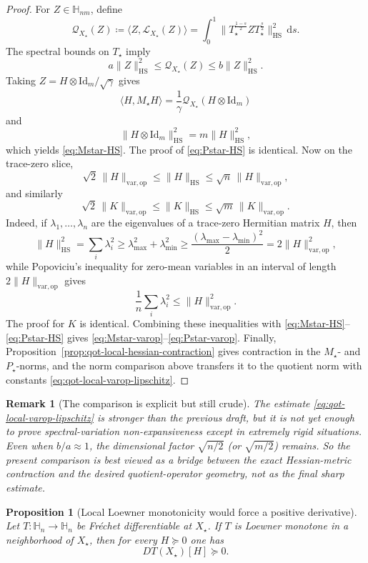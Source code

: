\documentclass[11pt]{article}
\newcommand{\Id}{\mathrm{Id}}
\newcommand{\eqdef}{\coloneqq}
\newcommand{\dotp}[2]{\langle #1,#2\rangle}
\newcommand{\Hh}{\mathbb{H}}
\newcommand{\op}{\mathrm{op}}
\newcommand{\varop}{\mathrm{var},\op}
\theoremstyle{plain}
\newtheorem{proposition}{Proposition}[section]
\newtheorem{remark}{Remark}[section]
\begin{document}
\begin{proof}
For $Z \in \Hh_{nm}$, define
\[
\mathcal Q_{X_\star}(Z)
\eqdef
\dotp{Z}{\mathcal L_{X_\star}(Z)}
=
\int_0^1 \|T_\star^{\frac{1-s}{2}} Z T_\star^{\frac{s}{2}}\|_{\mathrm{HS}}^2\,\mathrm ds.
\]
The spectral bounds on $T_\star$ imply
\[
a \|Z\|_{\mathrm{HS}}^2
\le
\mathcal Q_{X_\star}(Z)
\le
b \|Z\|_{\mathrm{HS}}^2.
\]
Taking $Z=H \otimes \Id_m/\sqrt{\gamma}$ gives
\[
\dotp{H}{M_\star H}
=
\frac1\gamma \mathcal Q_{X_\star}(H \otimes \Id_m)
\]
and
\[
\|H \otimes \Id_m\|_{\mathrm{HS}}^2
=
m\|H\|_{\mathrm{HS}}^2,
\]
which yields \eqref{eq:Mstar-HS}. The proof of \eqref{eq:Pstar-HS} is identical.
Now on the trace-zero slice,
\[
\sqrt{2}\,\|H\|_{\varop}\le \|H\|_{\mathrm{HS}}\le \sqrt{n}\,\|H\|_{\varop},
\]
and similarly
\[
\sqrt{2}\,\|K\|_{\varop}\le \|K\|_{\mathrm{HS}}\le \sqrt{m}\,\|K\|_{\varop}.
\]
Indeed, if $\lambda_1,\dots,\lambda_n$ are the eigenvalues of a trace-zero Hermitian matrix $H$, then
\[
\|H\|_{\mathrm{HS}}^2=\sum_i \lambda_i^2
\ge \lambda_{\max}^2+\lambda_{\min}^2
\ge \frac{(\lambda_{\max}-\lambda_{\min})^2}{2}
= 2\|H\|_{\varop}^2,
\]
while Popoviciu's inequality for zero-mean variables in an interval of length $2\|H\|_{\varop}$ gives
\[
\frac{1}{n}\sum_i \lambda_i^2 \le \|H\|_{\varop}^2.
\]
The proof for $K$ is identical.
Combining these inequalities with \eqref{eq:Mstar-HS}--\eqref{eq:Pstar-HS} gives \eqref{eq:Mstar-varop}--\eqref{eq:Pstar-varop}.
Finally, Proposition~\ref{prop:qot-local-hessian-contraction} gives contraction in the $M_\star$- and $P_\star$-norms, and the norm comparison above transfers it to the quotient norm with constants \eqref{eq:qot-local-varop-lipschitz}.
\end{proof}

\begin{remark}[The comparison is explicit but still crude]
\label{rem:qot-varop-comparison-crude}
The estimate \eqref{eq:qot-local-varop-lipschitz} is stronger than the previous draft, but it is not yet enough to prove spectral-variation non-expansiveness except in extremely rigid situations.
Even when $b/a \approx 1$, the dimensional factor $\sqrt{n/2}$ (or $\sqrt{m/2}$) remains.
So the present comparison is best viewed as a bridge between the exact Hessian-metric contraction and the desired quotient-operator geometry, not as the final sharp estimate.
\end{remark}

\begin{proposition}[Local Loewner monotonicity would force a positive derivative]
\label{prop:qot-local-monotone-derivative}
Let $T:\Hh_n \to \Hh_n$ be Fr\'echet differentiable at $X_\star$.
If $T$ is Loewner monotone in a neighborhood of $X_\star$, then for every $H \succeq 0$ one has
\[
DT(X_\star)[H] \succeq 0.
\]
\end{proposition}
\end{document}
